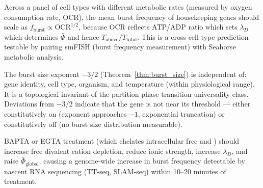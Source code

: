 \begin{proposition}
\label{prop:burst_metabolic_correlation}
Across a panel of cell types with different metabolic rates (measured by
oxygen consumption rate, OCR), the mean burst frequency of housekeeping genes
should scale as $f_{\mathrm{burst}} \propto \text{OCR}^{1/2}$, because OCR
reflects ATP/ADP ratio which sets $\lambda_D$ which determines $\bar\Phi$ and
hence $T_{\mathrm{above}}/T_{\mathrm{total}}$. This is a cross-cell-type
prediction testable by pairing smFISH (burst frequency measurement) with
Seahorse metabolic analysis.
\end{proposition}

\begin{proposition}
\label{prop:powerlaw_universal}
The burst size exponent $-3/2$ (Theorem~\ref{thm:burst_size}) is
independent of: gene identity, cell type, organism, and temperature (within
physiological range). It is a topological invariant of the partition phase
transition universality class. Deviations from $-3/2$ indicate that the gene
is not near its threshold --- either constitutively on (exponent approaches
$-1$, exponential truncation) or constitutively off (no burst size distribution
measurable).
\end{proposition}

\begin{proposition}
\label{prop:mg_chelation}
BAPTA or EGTA treatment (which chelates intracellular free  and
) should increase free divalent cation depletion, reduce ionic
strength, increase $\lambda_D$, and raise $\bar\Phi_{\mathrm{global}}$,
causing a genome-wide increase in burst frequency detectable by nascent RNA
sequencing (TT-seq, SLAM-seq) within 10--20 minutes of treatment.
\end{proposition}

